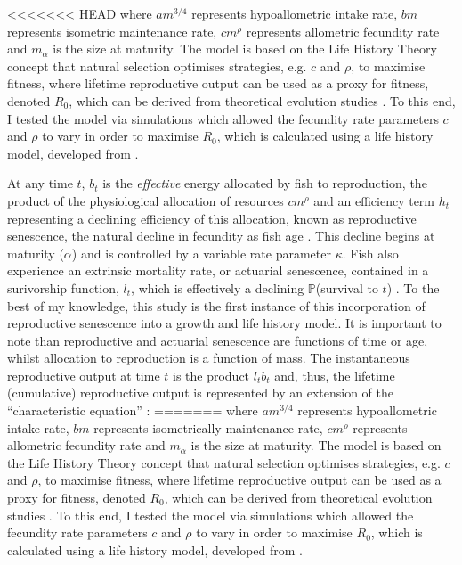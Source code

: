\documentclass[a4paper]{article} %
\begin{document}
\begin{center}
\begin{minipage}{\linewidth}
<<<<<<< HEAD
where $am^{3/4}$ represents hypoallometric intake rate, $bm$ represents isometric maintenance rate, $cm^{\rho}$ represents allometric fecundity rate and $m_{\alpha}$ is the size at maturity. The model is based on the Life History Theory concept that natural selection optimises strategies, e.g. $c$ and $\rho$, to maximise fitness, where lifetime reproductive output can be used as a proxy for fitness, denoted $R_0$, which can be derived from theoretical evolution studies \autocite{Charnov2001, stearns1992evolution}. To this end, I tested the model via simulations which allowed the fecundity rate parameters $c$ and $\rho$ to vary in order to maximise $R_0$, which is calculated using a life history model, developed from \textcite{Charnov2001}.

At any time $t$, $b_{t}$ is the \textit{effective} energy allocated by fish to reproduction, the product of the physiological allocation of resources $cm^{\rho}$ and an efficiency term $h_t$ representing a declining efficiency of this allocation, known as reproductive senescence, the natural decline in fecundity as fish age \autocite{Stearns2000, Benoit2018, Vrtilek2018}. This decline begins at maturity ($\alpha$) and is controlled by a variable rate parameter $\kappa$. Fish also experience an extrinsic mortality rate, or actuarial senescence, contained in a surivorship function, $l_t$, which is effectively a declining $\mathbb{P}$(survival to $t$) \autocite{Beverton1959, Peterson1984, Charnov1993,Walters1993, Charnov2001, Benoit2018, Laird2010, Reznick2002, Reznick2006}. To the best of my knowledge, this study is the first instance of this incorporation of reproductive senescence into a growth and life history model. It is important to note than reproductive and actuarial senescence are functions of time or age, whilst allocation to reproduction is a function of mass. The instantaneous reproductive output at time $t$ is the product $l_{t}b_{t}$ and, thus, the lifetime (cumulative) reproductive output is represented by an extension of the ``characteristic equation'' \autocite{roff1992evolution, roff2002life, stearns1992evolution, Arendt2011, Tsoukali2016}:
=======
where $am^{3/4}$ represents hypoallometric intake rate, $bm$ represents isometrically maintenance rate, $cm^{\rho}$ represents allometric fecundity rate and $m_{\alpha}$ is the size at maturity. The model is based on the Life History Theory concept that natural selection optimises strategies, e.g. $c$ and $\rho$, to maximise fitness, where lifetime reproductive output can be used as a proxy for fitness, denoted $R_0$, which can be derived from theoretical evolution studies \autocite{Charnov2001, stearns1992evolution}. To this end, I tested the model via simulations which allowed the fecundity rate parameters $c$ and $\rho$ to vary in order to maximise $R_0$, which is calculated using a life history model, developed from \textcite{Charnov2001}.


\end{minipage}
\end{center}
\end{document}
